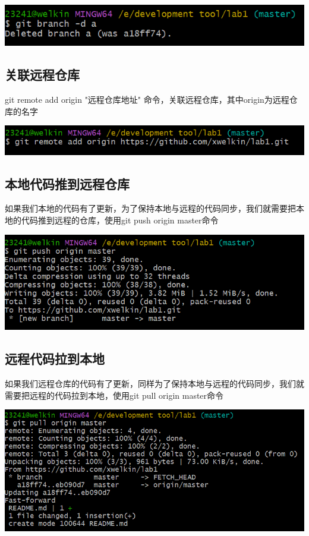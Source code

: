 \documentclass[UTF8,a4paper]{ctexart}
\begin{document}
\begin{sloppypar}
	\includegraphics[width = 16cm]{9}
	
	\subsection{关联远程仓库}
	git remote add origin "远程仓库地址" 命令，关联远程仓库，其中origin为远程仓库的名字
	
	\includegraphics[width = 16cm]{10}
	
	\subsection{本地代码推到远程仓库}
	如果我们本地的代码有了更新，为了保持本地与远程的代码同步，我们就需要把本地的代码推到远程的仓库，使用git push origin master命令
	
	\includegraphics[width = 16cm]{11}
	
	\subsection{远程代码拉到本地}
	如果我们远程仓库的代码有了更新，同样为了保持本地与远程的代码同步，我们就需要把远程的代码拉到本地，使用git pull origin master命令
	
	\includegraphics[width = 16cm]{12}
	

\end{sloppypar}
\end{document}
